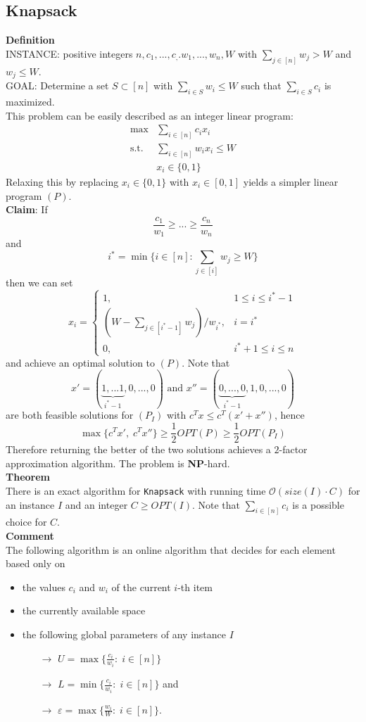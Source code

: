 \documentclass[a4paper, 12pt]{article}
\begin{document}
	\subsection{Knapsack}
	\textbf{Definition}\\
	INSTANCE: positive integers $n, c_1,...,c_,.w_1,...,w_n,W$ with $\sum_{j \in [n]} w_j > W$ and $w_j \leq W$.\\
	GOAL: Determine a set $S \subset [n]$ with $\sum_{i \in S} w_i \leq W$ such that $\sum_{i \in S} c_i$ is maximized.\\
	
	This problem can be easily described as an integer linear program: \begin{align*}
		\max &\sum_{i\in [n]} c_i x_i\\
		\text{s.t. } &\sum_{i\in [n]} w_i x_i \leq W\\
		&x_i \in \{0,1\}
	\end{align*}
	Relaxing this by replacing $x_i \in \{0,1\}$ with $x_i \in [0,1]$ yields a simpler linear program $(P)$.\\
	\textbf{Claim}: If \[\frac{c_1}{w_1} \geq ... \geq \frac{c_n}{w_n}\]
	and \[i^* = \min \{i \in [n]: \sum_{j \in [i]} w_j \geq W\}\]
	then we can set \[x_i = \begin{cases}
		1, & 1 \leq i \leq i^*-1\\
		(W-\sum_{j \in [i^*-1]}w_j)/w_{i^*}, & i = i^*\\
		0, & i^*+1 \leq i \leq n
	\end{cases}\]
	and achieve an optimal solution to $(P)$. Note that \[x' = (\underbrace{1,...1}_{i^*-1},0,...,0) \text{ and } x'' = (\underbrace{0,...,0}_{i^*-1},1,0,...,0)\]
	are both feasible solutions for $(P_I)$ with $c^Tx \leq c^T(x'+x'')$, hence \[\max\{c^Tx',\; c^Tx''\} \geq \frac{1}{2} OPT(P) \geq \frac{1}{2} OPT(P_I)\] Therefore returning the better of the two solutions achieves a $2$-factor approximation algorithm. The problem is \textbf{NP}-hard.\\
	\textbf{Theorem}\\
	There is an exact algorithm for \texttt{Knapsack} with running time $\mathcal{O}(size(I)\cdot C)$ for an instance $I$ and an integer $C \geq OPT(I)$. Note that $\sum_{i\in [n]}c_i$ is a possible choice for $C$.\\
	\textbf{Comment}\\
	The following algorithm is an online algorithm that decides for each element based only on \begin{itemize}
		\item the values $c_i$ and $w_i$ of the current $i$-th item
		\item the currently available space
		\item the following global parameters of any instance $I$ \begin{itemize}
			\item[$\rightarrow$] $U = \max\{\frac{c_i}{w_i}: \; i \in [n]\}$
			\item[$\rightarrow$] $L = \min\{\frac{c_i}{w_i}: \; i \in [n]\}$ and 
			\item[$\rightarrow$] $\varepsilon = \max\{\frac{w_i}{W}: \; i \in [n]\}$.
		\end{itemize}
	\end{itemize}
\end{document}
